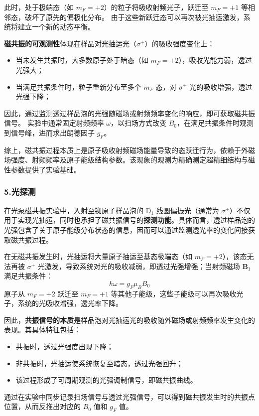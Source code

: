 \documentclass[12pt,a4paper,UTF8]{ctexart}
\begin{document}
此时，处于极端态（如 $m_F = +2$）的粒子将吸收射频光子，跃迁至 $m_F = +1$ 等相邻态，破坏了原先的偏极化分布。
由于这些新跃迁态可以再次被光抽运激发，系统将建立一个新的动态平衡。

\textbf{磁共振的可观测性}体现在样品对光抽运光（$\sigma^+$）的吸收强度变化上：
\begin{itemize}
  \item 当未发生共振时，大多数原子处于暗态（如 $m_F = +2$），吸收光能力弱，透过光强大；
  \item 当满足共振条件时，粒子重新分布至多个 $m_F$ 态，对 $\sigma^+$ 光的吸收增强，透过光强下降；
\end{itemize}

因此，通过监测透过样品泡的光强随磁场或射频频率变化的响应，即可获取磁共振信号。
实验中通常固定射频频率 $\omega$，以扫场方式改变 $B_0$，在满足共振条件时观测到信号峰，进而求出朗德因子 $g_F$。

综上，磁共振过程本质上是原子吸收射频磁场能量导致的态跃迁行为，依赖于外磁场强度、射频频率及原子能级结构参数。该现象的观测为精确测定超精细结构与磁性参数提供了实验基础。

\subsubsection*{5.光探测}
在光泵磁共振实验中，入射至铷原子样品泡的 $\mathrm{D}_1$ 线圆偏振光（通常为 $\sigma^+$）不仅用于实现光抽运，同时也承担了磁共振信号的\textbf{探测功能}。具体而言，透过样品泡的光强包含了关于原子能级分布状态的信息，因而可以通过监测透光率的变化间接获取磁共振过程。

在无磁共振发生时，光抽运将大量原子抽运至基态极端态（如 $m_F = +2$），该态无法再被 $\sigma^+$ 光激发，导致系统对光的吸收减弱，即透过光强增强；当射频磁场 $\mathbf{B}_1$ 满足共振条件：
\[
\hbar \omega = g_F \mu_B B_0
\]
原子从 $m_F = +2$ 跃迁至 $m_F = +1$ 等其他子能级，这些子能级可以再次吸收光子，系统的光吸收增强，透光率下降。

因此，\textbf{共振信号的本质}是样品泡对光抽运光的吸收随外磁场或射频频率发生变化的表现。其具体特征包括：
\begin{itemize}
  \item 共振时，透过光强度出现下降；
  \item 非共振时，光抽运使系统恢复至暗态，透过光强回升；
  \item 该过程形成了可周期观测的光强调制信号，即磁共振曲线。
\end{itemize}

通过在实验中同步记录扫场信号与透过光强信号，可以得到磁共振发生时的共振点位置，从而反推出对应的 $B_0$ 值和 $g_F$ 值。
\end{document}
